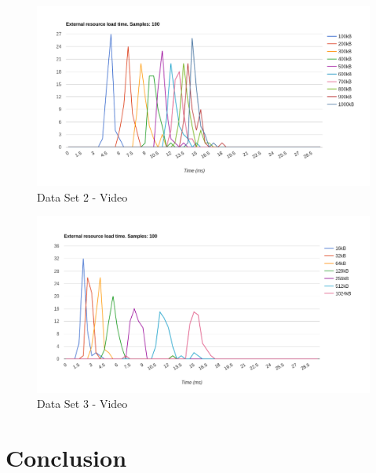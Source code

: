 \documentclass[10pt,a4paper,twoside]{book}
\begin{document}
\begin{figure}[h]
\centering
\includegraphics[width=\textwidth]{figures/v100L100.png}
\caption{Data Set 2 - Video}
\label{fig:videointerface}
\end{figure}

\begin{figure}[h]
\centering
\includegraphics[width=\textwidth]{figures/v100E.png}
\caption{Data Set 3 - Video}
\label{fig:videointerface}
\end{figure}



\chapter{Conclusion}
\label{chap:conclusion}




\cleardoublepage
\pagestyle{marked}



\end{document}

